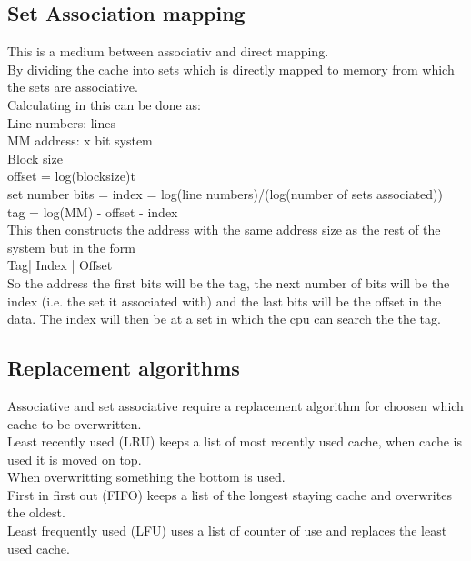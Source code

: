 \documentclass[12pt, a4paper]{article}
\begin{document}
		\subsection{Set Association mapping}
			This is a medium between associativ and direct mapping.\\
			By dividing the cache into sets which is directly mapped to memory from which the sets are associative.\\
			Calculating in this can be done as:\\
			Line numbers: lines\\
			MM address: x bit system\\
			Block size\\
			offset = log(blocksize)t \\
			set number bits = index = log(line  numbers)/(log(number of sets associated))\\
			tag  = log(MM) - offset - index\\
			This then constructs the address with the same address size as the rest of the system but in the form\\
			Tag| Index | Offset\\
			So the address the first bits will be the tag, the next number of bits will be the index (i.e. the set it associated with) and the last bits will be the offset in the data.
			The index will then be at a set in which the cpu can search the the tag.
		\subsection{Replacement algorithms}
			Associative and set associative require a replacement algorithm for choosen which cache to be overwritten.\\
			Least recently used (LRU) keeps a list of most recently used cache, when cache is used it is moved on top.\\
			When overwritting something the bottom is used.\\
			First in first out (FIFO) keeps a list of the longest staying cache and overwrites the oldest.\\
			Least frequently used (LFU) uses a list of counter of use and replaces the least used cache.\\
\end{document}
